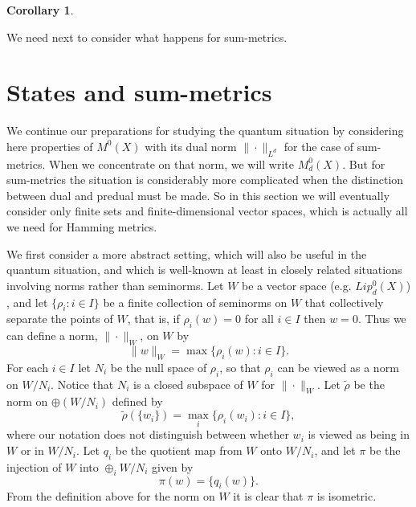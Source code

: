 \documentclass{amsart}[14pt]
\newtheorem{corollary}[theorem]{Corollary}
\theoremstyle{definition}
\theoremstyle{remark}
\newcommand{\<}{\langle}
\renewcommand{\>}{\rangle}
\numberwithin{equation}{section}
\begin{document}
{\begin{corollary}
\end{corollary}

We need next to consider what happens for sum-metrics.


\section{States and sum-metrics}
\label{sumcos}

We continue our preparations for studying the quantum situation
by considering here properties of $M^0(X)$ with its dual
norm $\|\cdot\|_{L^d}$ for 
the case of sum-metrics. When we concentrate on that norm, 
we will write $M^0_d(X)$.
But for sum-metrics the situation is considerably more complicated
when the distinction between dual and predual must be made. So
in this section we will eventually consider only finite sets and finite-dimensional
vector spaces, which is actually all we need for Hamming metrics.

 We first
consider a more abstract setting, which will also be useful in
the quantum situation, and which is well-known 
at least in
closely related situations involving norms rather than seminorms.
Let $W$ be a vector space (e.g. $Lip^0_d(X)$) , 
and let $\{\rho_i: i \in I\}$ be a finite collection of seminorms on 
$ W$ that collectively separate the points of $ W $, that is,
if $\rho_i(w) = 0 $ for all $i \in I $ then $w=0 $. Thus we can
define a norm, $\|\cdot\|_W $, on $W $ by
\begin{equation}
\label{sumnorm}
\|w\|_W = \max \{\rho_i(w): i \in I\}.
\end{equation}
For each $i \in I $ let $N_i$
be the null space of $\rho_i $, so that $\rho_i $ can be viewed 
as a norm on $W/N_i $. Notice that $N_i$ is a closed subspace of $W$ 
for $\| \cdot\|_W$. Let $\tilde \rho $ be the norm on 
$\oplus (W/N_i) $ defined by
\begin{equation}
\label{addanorm}
\tilde \rho(\{w_i\}) = \max_i \{\rho_i(w_i): i \in I\},
\end{equation}
where our notation does not distinguish between whether $w_i$
is viewed as being in $W$ or in $W/N_i$. Let $q_i $ be the 
quotient map from 
$W $ onto $W/N_i $,
and let $\pi$ be the injection of $W$ into $\oplus_i W/N_i $ given by
\begin{equation}
\label{inaject}
\pi(w) = \{q_i(w)\}. 
\end{equation}
From the definition above for the norm on
$W$ it is clear that $\pi$ is isometric.

}
\end{document}
